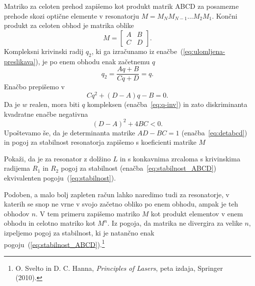 Matriko 
za celoten prehod zapišemo kot produkt matrik ABCD za posamezne prehode skozi 
optične elemente v resonatorju $M = M_N M_{N-1} ...M_2 M_1$.
Končni produkt za celoten obhod je matrika oblike
\begin{equation}
M = \left[\begin{array}{cc}
A & B\\
C & D
\end{array}\right]\!\!.
\end{equation}
Kompleksni krivinski radij $q_2$, ki ga izračunamo iz enačbe~(\ref{eq:ulomljena-preslikava}), 
je po enem obhodu enak začetnemu $q$
\begin{equation}
q_2 = \frac{Aq+B}{Cq+D} = q.
\end{equation}
Enačbo prepišemo v 
\begin{equation}
Cq^2+(D-A)q-B=0.
\end{equation}
Da je $w$ realen, mora biti $q$ kompleksen (enačba~\ref{eq:q-inv}) 
in zato diskriminanta kvadratne enačbe negativna
\begin{equation}
(D-A)^2+ 4BC<0.
\end{equation}
Upoštevamo še, da je determinanta matrike $AD-BC=1$ (enačba~\ref{eq:detabcd}) in pogoj za 
stabilnost resonatorja zapišemo s koeficienti matrike $M$

\begin{naloga}
Pokaži, da je za resonator z dolžino $L$ in s konkavnima zrcaloma s krivinskima radijema $R_1$ in $R_2$ 
pogoj za stabilnost (enačba~\ref{eq:stabilnost_ABCD}) ekvivalenten pogoju~(\ref{eq:stabilnost}).
\end{naloga}

\begin{remark}
Podoben, a malo bolj zapleten račun lahko naredimo tudi za resonatorje, v katerih se snop 
ne vrne v svojo začetno obliko po enem obhodu, ampak je teh obhodov $n$. V tem primeru zapišemo
matriko $M$ kot produkt elementov v enem obhodu in celotno matriko kot $M^n$. Iz pogoja,
da matrika ne divergira za velike $n$, izpeljemo pogoj za stabilnost, ki je natančno 
enak pogoju~(\ref{eq:stabilnost_ABCD}).\footnote{O. Svelto in D. C. Hanna, 
{\it Principles of Lasers}, peta izdaja, Springer (2010).}
\end{remark}
\newpage

